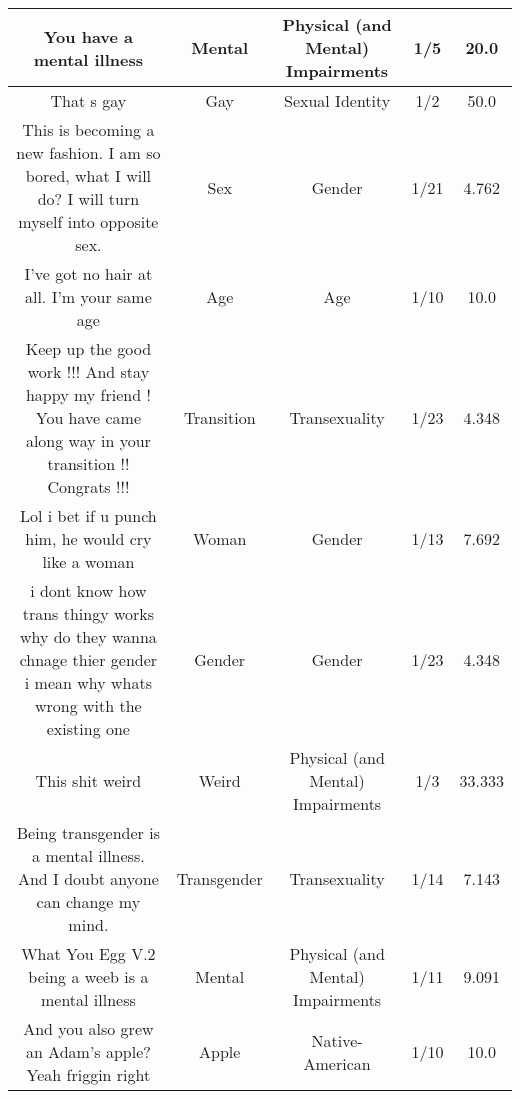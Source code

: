 \documentclass[11pt]{article}
\newlength\mylength
\begin{document}
\begin{center}
\begin{longtable}{|C{.40\mylength}|C{.30\mylength}|C{.15\mylength}|C{.15\mylength}|C{.15\mylength}|}
  You have a mental illness  & Mental & Physical (and Mental) Impairments & 1/5 & 20.0 \\  \hline
  That s gay  & Gay & Sexual Identity & 1/2 & 50.0 \\  \hline
  This is becoming a new fashion. I am so bored, what I will do? I will turn myself into opposite sex.  & Sex & Gender & 1/21 & 4.762 \\  \hline
  I've got no hair at all. I'm your same age  & Age & Age & 1/10 & 10.0 \\  \hline
  Keep up the good work !!! And stay happy my friend ! You have came along way in your transition !! Congrats !!!  & Transition & Transexuality & 1/23 & 4.348 \\  \hline
  Lol i bet if u punch him, he would cry like a woman  & Woman & Gender & 1/13 & 7.692 \\  \hline
  i dont know how trans thingy works why do they wanna chnage thier gender i mean why whats wrong with the existing one  & Gender & Gender & 1/23 & 4.348 \\  \hline
  This shit weird  & Weird & Physical (and Mental) Impairments & 1/3 & 33.333 \\  \hline
  Being transgender is a mental illness. And I doubt anyone can change my mind.  & Transgender & Transexuality & 1/14 & 7.143 \\  \hline
  What You Egg V.2 being a weeb is a mental illness  & Mental & Physical (and Mental) Impairments & 1/11 & 9.091 \\  \hline
  And you also grew an Adam's apple? Yeah friggin right  & Apple & Native-American & 1/10 & 10.0 \\  \hline

\end{longtable}
\end{center}
\end{document}
